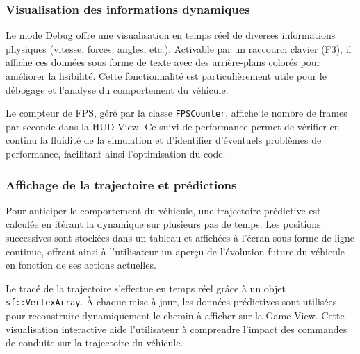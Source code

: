 \subsubsection{Visualisation des informations dynamiques}\label{subsubsec:visualisation-des-informations-dynamiques}

\label{subsubsubsec:mode-de-debug}
Le mode Debug offre une visualisation en temps réel de diverses informations physiques (vitesse, forces, angles, etc.). Activable par un raccourci clavier (F3), il affiche ces données sous forme de texte avec des arrière-plans colorés pour améliorer la lisibilité.
Cette fonctionnalité est particulièrement utile pour le débogage et l'analyse du comportement du véhicule.

\label{subsubsubsec:compteur-de-fps}
Le compteur de FPS, géré par la classe \texttt{FPSCounter}, affiche le nombre de frames par seconde dans la HUD View.
Ce suivi de performance permet de vérifier en continu la fluidité de la simulation et d'identifier d'éventuels problèmes de performance, facilitant ainsi l'optimisation du code.

\subsubsection{Affichage de la trajectoire et prédictions}\label{subsubsec:affichage-de-la-trajectoire-et-predictions}

\label{subsubsubsec:calcul-de-la-trajectoire-predictive}
Pour anticiper le comportement du véhicule, une trajectoire prédictive est calculée en itérant la dynamique sur plusieurs pas de temps.
Les positions successives sont stockées dans un tableau et affichées à l'écran sous forme de ligne continue, offrant ainsi à l'utilisateur un aperçu de l'évolution future du véhicule en fonction de ses actions actuelles.

\label{subsubsubsec:trace-en-temps-reel-via-les-donnees-issues-de-la-simulation}
Le tracé de la trajectoire s'effectue en temps réel grâce à un objet \texttt{sf::VertexArray}.
À chaque mise à jour, les données prédictives sont utilisées pour reconstruire dynamiquement le chemin à afficher sur la Game View.
Cette visualisation interactive aide l'utilisateur à comprendre l'impact des commandes de conduite sur la trajectoire du véhicule.

